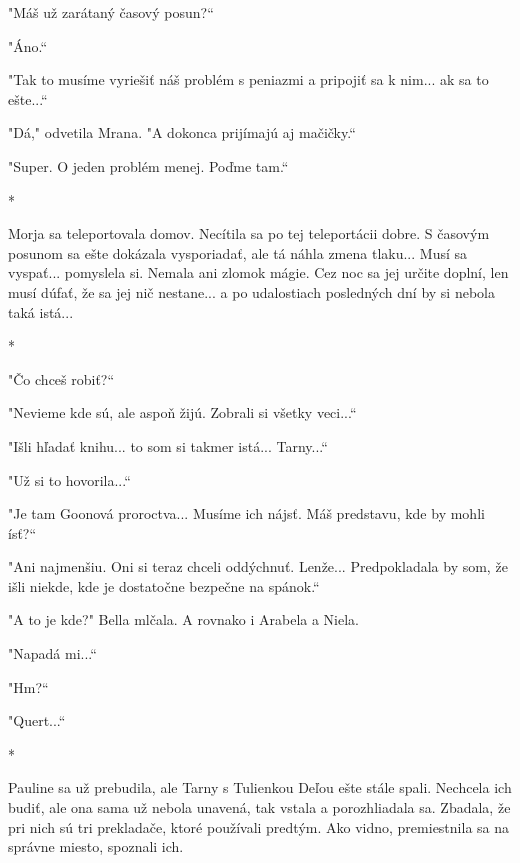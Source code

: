\documentclass{book}
\begin{document}
"$ $Máš už zarátaný časový posun?“

"$ $Áno.“

"$ $Tak to musíme vyriešiť náš problém s peniazmi a pripojiť sa k nim... ak sa to ešte...“

"$ $Dá,"$ $ odvetila Mrana. "$ $A dokonca prijímajú aj mačičky.“

"$ $Super. O jeden problém menej. Poďme tam.“

\begin{center}

*

\end{center}

Morja sa teleportovala domov. Necítila sa po tej teleportácii dobre. S časovým posunom sa ešte dokázala vysporiadať, ale tá náhla zmena tlaku... Musí sa vyspať... pomyslela si. Nemala ani zlomok mágie. Cez noc sa jej určite doplní, len musí dúfať, že sa jej nič nestane... a po udalostiach posledných dní by si nebola taká istá...

\begin{center}

*

\end{center}

"$ $Čo chceš robiť?“

"$ $Nevieme kde sú, ale aspoň žijú. Zobrali si všetky veci...“

"$ $Išli hľadať knihu... to som si takmer istá... Tarny...“

"$ $Už si to hovorila...“

"$ $Je tam Goonová proroctva... Musíme ich nájsť. Máš predstavu, kde by mohli ísť?“

"$ $Ani najmenšiu. Oni si teraz chceli oddýchnuť. Lenže... Predpokladala by som, že išli niekde, kde je dostatočne bezpečne na spánok.“

"$ $A to je kde?"$ $ Bella mlčala. A rovnako i Arabela a Niela.

"$ $Napadá mi...“

"$ $Hm?“

"$ $Quert...“

\begin{center}

*

\end{center}

Pauline sa už prebudila, ale Tarny s Tulienkou Deľou ešte stále spali. Nechcela ich budiť, ale ona sama už nebola unavená, tak vstala a porozhliadala sa. Zbadala, že pri nich sú tri prekladače, ktoré používali predtým. Ako vidno, premiestnila sa na správne miesto, spoznali ich.
\end{document}

